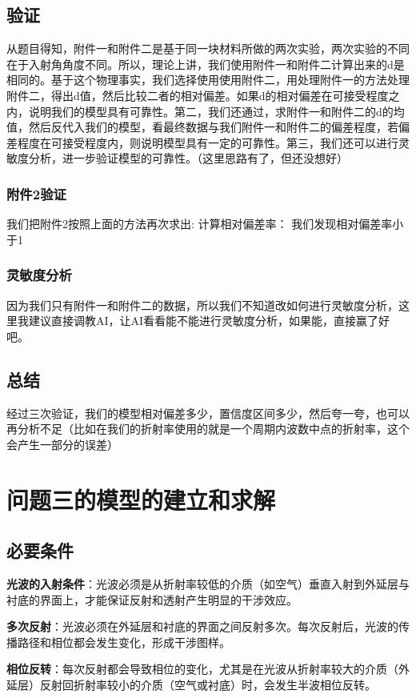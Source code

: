 \documentclass{cumcmthesis}
\begin{document}
	
\subsection{验证}
从题目得知，附件一和附件二是基于同一块材料所做的两次实验，两次实验的不同在于入射角角度不同。所以，理论上讲，我们使用附件一和附件二计算出来的d是相同的。基于这个物理事实，我们选择使用使用附件二，用处理附件一的方法处理附件二，得出d值，然后比较二者的相对偏差。如果d的相对偏差在可接受程度之内，说明我们的模型具有可靠性。第二，我们还通过，求附件一和附件二的d的均值，然后反代入我们的模型，看最终数据与我们附件一和附件二的偏差程度，若偏差程度在可接受程度内，则说明模型具有一定的可靠性。第三，我们还可以进行灵敏度分析，进一步验证模型的可靠性。（这里思路有了，但还没想好）
\subsubsection{附件2验证}
我们把附件2按照上面的方法再次求出:
计算相对偏差率：
我们发现相对偏差率小于1


\subsubsection{灵敏度分析}
因为我们只有附件一和附件二的数据，所以我们不知道改如何进行灵敏度分析，这里我建议直接调教AI，让AI看看能不能进行灵敏度分析，如果能，直接赢了好吧。
\subsection{总结}
经过三次验证，我们的模型相对偏差多少，置信度区间多少，然后夸一夸，也可以再分析不足（比如在我们的折射率使用的就是一个周期内波数中点的折射率，这个会产生一部分的误差）

\section{问题三的模型的建立和求解}
\subsection{必要条件}
\textbf{光波的入射条件}：光波必须是从折射率较低的介质（如空气）垂直入射到外延层与衬底的界面上，才能保证反射和透射产生明显的干涉效应。

\textbf{多次反射}：光波必须在外延层和衬底的界面之间反射多次。每次反射后，光波的传播路径和相位都会发生变化，形成干涉图样。

\textbf{相位反转}：每次反射都会导致相位的变化，尤其是在光波从折射率较大的介质（外延层）反射回折射率较小的介质（空气或衬底）时，会发生半波相位反转。
\end{document}
